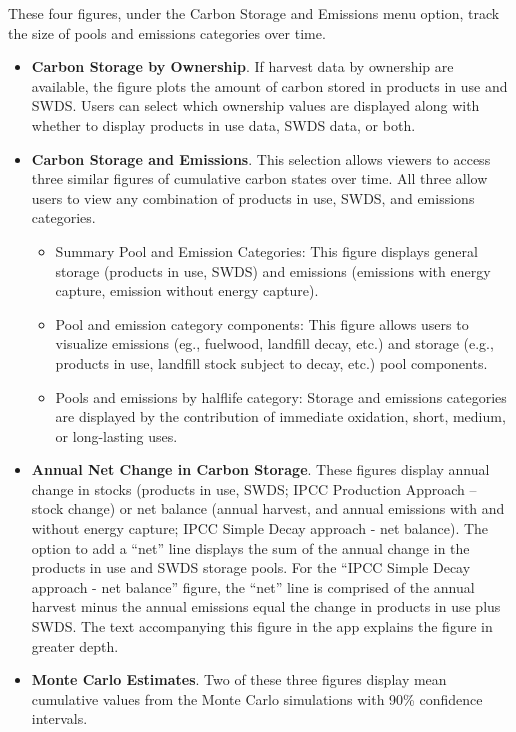 \documentclass[
  openany]{book}
\providecommand{\tightlist}{%
  \setlength{\itemsep}{0pt}\setlength{\parskip}{0pt}}
\begin{document}
These four figures, under the Carbon Storage and Emissions menu option, track the size of pools and emissions categories over time.

\begin{itemize}
\item
  \textbf{Carbon Storage by Ownership}. If harvest data by ownership are available, the figure plots the amount of carbon stored in products in use and SWDS. Users can select which ownership values are displayed along with whether to display products in use data, SWDS data, or both.\\
\item
  \textbf{Carbon Storage and Emissions}. This selection allows viewers to access three similar figures of cumulative carbon states over time. All three allow users to view any combination of products in use, SWDS, and emissions categories.

  \begin{itemize}
  \tightlist
  \item
    Summary Pool and Emission Categories: This figure displays general storage (products in use, SWDS) and emissions (emissions with energy capture, emission without energy capture).
  \item
    Pool and emission category components: This figure allows users to visualize emissions (eg., fuelwood, landfill decay, etc.) and storage (e.g., products in use, landfill stock subject to decay, etc.) pool components.
  \item
    Pools and emissions by halflife category: Storage and emissions categories are displayed by the contribution of immediate oxidation, short, medium, or long-lasting uses.\\
  \end{itemize}
\item
  \textbf{Annual Net Change in Carbon Storage}. These figures display annual change in stocks (products in use, SWDS; IPCC Production Approach -- stock change) or net balance (annual harvest, and annual emissions with and without energy capture; IPCC Simple Decay approach - net balance). The option to add a ``net'' line displays the sum of the annual change in the products in use and SWDS storage pools. For the ``IPCC Simple Decay approach - net balance'' figure, the ``net'' line is comprised of the annual harvest minus the annual emissions equal the change in products in use plus SWDS. The text accompanying this figure in the app explains the figure in greater depth.
\item
  \textbf{Monte Carlo Estimates}. Two of these three figures display mean cumulative values from the Monte Carlo simulations with 90\% confidence intervals.


\end{itemize}
\end{document}

